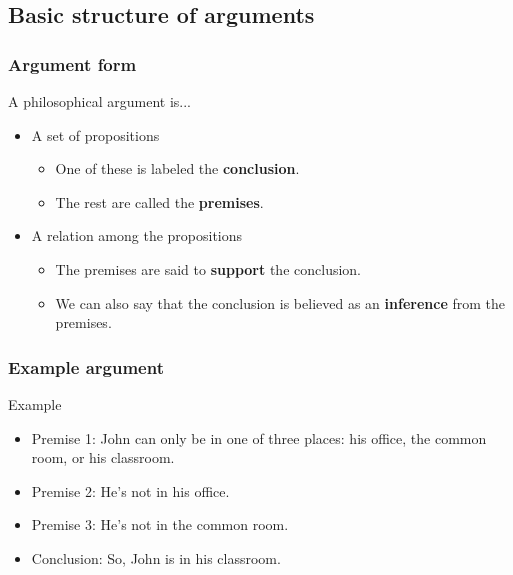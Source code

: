 \documentclass[10pt,letterpaper,xcolor=dvipsnames,handout]{beamer}
\begin{document}
\subsection{Basic structure of arguments}

\begin{frame}
\frametitle{Argument form}

\begin{block}{A philosophical argument is...}
  \begin{itemize}
    \item<2-> A set of propositions
      \begin{itemize}
        \item One of these is labeled the \textbf{conclusion}.
        \item The rest are called the \textbf{premises}.
      \end{itemize}
    \item<3-> A relation among the propositions
      \begin{itemize}
        \item The premises are said to \textbf{support} the conclusion.
        \item We can also say that the conclusion is believed as an \textbf{inference} from the premises.
      \end{itemize}
  \end{itemize}
\end{block}
  
 
\end{frame}

\begin{frame}
\frametitle{Example argument}

\begin{block}{Example}
  \begin{itemize}
    \item Premise 1: John can only be in one of three places: his office, the common room, or his classroom.
    \item Premise 2: He's not in his office.
    \item Premise 3: He's not in the common room.
    \item Conclusion: So, John is in his classroom.
  \end{itemize}
\end{block}


\end{frame}
\end{document}
